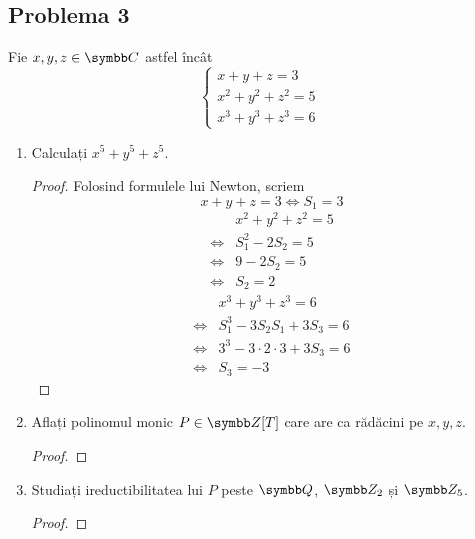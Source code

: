 \subsection*{Problema 3}

Fie \(x, y, z \in \complex\) astfel încât
\[
    \begin{cases}
        x + y + z = 3 \\
        x^2 + y^2 + z^2 = 5 \\
        x^3 + y^3 + z^3 = 6
    \end{cases}
\]

\begin{enumerate}
    \item Calculați \(x^5 + y^5 + z^5\).
    \begin{proof}
    Folosind formulele lui Newton, scriem
    \[x + y + z = 3 \iff S_1 = 3\]
    \begin{align*}
        & x^2 + y^2 + z^2 = 5 \\
        \iff & S_1^2 - 2 S_2 = 5 \\
        \iff & 9 - 2 S_2 = 5 \\
        \iff & S_2 = 2
    \end{align*}
    \begin{align*}
        & x^3 + y^3 + z^3 = 6 \\
        \iff & S_1^3 - 3 S_2 S_1 + 3 S_3 = 6 \\
        \iff & 3^3 - 3 \cdot 2 \cdot 3 + 3 S_3 = 6 \\
        \iff & S_3 = -3
    \end{align*}
    \end{proof}

    \item Aflați polinomul monic \(P \in \integers[T]\) care are ca rădăcini pe \(x, y, z\).
    \begin{proof}

    \end{proof}

    \item Studiați ireductibilitatea lui \(P\) peste \(\rationals\), \(\integersmod{2}\) și \(\integersmod{5}\).
    \begin{proof}

    \end{proof}
\end{enumerate}
